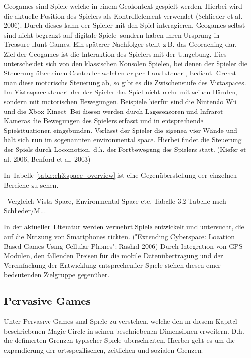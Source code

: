 Geogames sind Spiele welche in einem Geokontext gespielt werden. Hierbei wird die aktuelle Position des Spielers als Kontrollelement verwendet (Schlieder et al. 2006). Durch dieses kann der Spieler mit den Spiel interagieren.
Geogames selbst sind nicht begrenzt auf digitale Spiele, sondern haben Ihren Ursprung in Treasure-Hunt Games. Ein späterer Nachfolger stellt z.B. das Geocaching dar.
Ziel der Geogames ist die Interaktion des Spielers mit der Umgebung. Dies unterscheidet sich von den klassischen Konsolen Spielen, bei denen der Spieler die Steuerung über einen Controller welchen er per Hand steuert, bedient. Grenzt man diese motorische Steuerung ab, so gibt es die Zwischenstufe des Vistaspaces. Im Vistaspace steuert der der Spieler das Spiel nicht mehr mit seinen Händen, sondern mit motorischen Bewegungen. Beispiele hierfür sind die Nintendo Wii und die Xbox Kinect. Bei diesen werden durch Lagesensoren und Infrarot Kameras die Bewegungen des Spielers erfasst und in entsprechende Spielsituationen eingebunden.
Verlässt der Spieler die eigenen vier Wände und hält sich nun im sogenannten environmental space.
Hierbei findet die Steuerung der Spiels durch Locomotion, d.h. der Fortbewegung des Spielers statt. (Kiefer et al. 2006, Benford et al. 2003)

In Tabelle \ref{table:ch3:space_overview} ist eine Gegenüberstellung der einzelnen Bereiche zu sehen.

--Vergleich Vista Space, Environmental Space etc. Tabelle 3.2
Tabelle nach Schlieder/M...
\label{table:ch3:space_overview}

In der aktuellen Literatur werden vermehrt Spiele entwickelt und untersucht, die auf die Nutzung von Smartphones richten. ("Extending Cyberspace: Location Based Games Using Cellular Phones":
Rashid 2006)
Durch Integration von GPS-Modulen, den fallenden Preisen für die mobile Datenübertragung und der Vereinfachung der Entwicklung entsprechender Spiele stehen diesen einer bedeutenden Zielgruppe gegenüber.

\subsection*{Pervasive Games}

Unter Pervasive Games sind Spiele zu verstehen, welche den in diesem Kapitel beschriebenen Magic Circle in seinen beschriebenen Dimensionen erweitern.
D.h. die definierten Grenzen typischer Spiele überschreiten. \cite{Montola.2005}
Hierbei geht es um die expandierung der ortsspezifischen, zeitlichen und sozialen Grenzen. \cite{Montola.2009}




